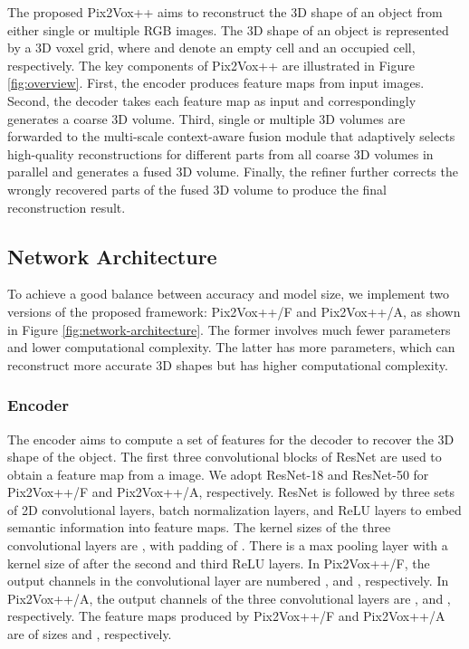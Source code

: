 \documentclass[twocolumn]{svjour3}
\begin{document}
The proposed Pix2Vox++ aims to reconstruct the 3D shape of an object from either single or multiple RGB images. 
The 3D shape of an object is represented by a 3D voxel grid, where  and  denote an empty cell and an occupied cell, respectively.
The key components of Pix2Vox++ are illustrated in Figure \ref{fig:overview}.
First, the encoder produces feature maps from input images.
Second, the decoder takes each feature map as input and correspondingly generates a coarse 3D volume.
Third, single or multiple 3D volumes are forwarded to the multi-scale context-aware fusion module that adaptively selects high-quality reconstructions for different parts from all coarse 3D volumes in parallel and generates a fused 3D volume.
Finally, the refiner further corrects the wrongly recovered parts of the fused 3D volume to produce the final reconstruction result.

\subsection{Network Architecture}

To achieve a good balance between accuracy and model size, we implement two versions of the proposed framework: Pix2Vox++/F and Pix2Vox++/A, as shown in Figure \ref{fig:network-architecture}.
The former involves much fewer parameters and lower computational complexity.
The latter has more parameters, which can reconstruct more accurate 3D shapes but has higher computational complexity.

\subsubsection{Encoder}

The encoder aims to compute a set of features for the decoder to recover the 3D shape of the object.
The first three convolutional blocks of ResNet \citep{DBLP:conf/cvpr/HeZRS16} are used to obtain a  feature map from a  image.
We adopt ResNet-18 and ResNet-50 for Pix2Vox++/F and Pix2Vox++/A, respectively.
ResNet is followed by three sets of 2D convolutional layers, batch normalization layers, and ReLU layers to embed semantic information into feature maps.
The kernel sizes of the three convolutional layers are , with padding of .
There is a max pooling layer with a kernel size of  after the second and third ReLU layers.
In Pix2Vox++/F, the output channels in the convolutional layer are numbered ,  and , respectively.
In Pix2Vox++/A, the output channels of the three convolutional layers are ,  and , respectively.
The feature maps produced by Pix2Vox++/F and Pix2Vox++/A are of sizes  and , respectively.
\end{document}
